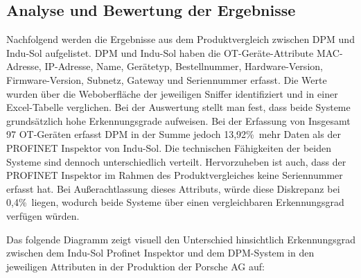 \subsection{Analyse und Bewertung der Ergebnisse}

Nachfolgend werden die Ergebnisse aus dem Produktvergleich zwischen DPM und Indu-Sol aufgelistet. DPM und Indu-Sol haben die OT-Geräte-Attribute MAC-Adresse, IP-Adresse, Name, Gerätetyp, Bestellnummer, Hardware-Version, Firmware-Version, Subnetz, Gateway und Seriennummer erfasst. Die Werte wurden über die Weboberfläche der jeweiligen Sniffer identifiziert und in einer Excel-Tabelle verglichen. Bei der Auswertung stellt man fest, dass beide Systeme grundsätzlich hohe Erkennungsgrade aufweisen.  Bei der Erfassung von Insgesamt 97 OT-Geräten erfasst DPM in der Summe jedoch 13,92\%\ mehr Daten als der PROFINET Inspektor von Indu-Sol. 
Die technischen Fähigkeiten der beiden Systeme sind dennoch unterschiedlich verteilt. Hervorzuheben ist auch, dass der PROFINET Inspektor im Rahmen des Produktvergleiches keine Seriennummer erfasst hat. Bei Außerachtlassung dieses Attributs, würde diese Diskrepanz bei 0,4\%\ liegen, wodurch beide Systeme über einen vergleichbaren Erkennungsgrad verfügen würden.  


\clearpage \noindent Das folgende Diagramm zeigt visuell den Unterschied hinsichtlich Erkennungsgrad zwischen dem Indu-Sol Profinet Inspektor und dem DPM-System in den jeweiligen Attributen in der Produktion der Porsche AG auf:


